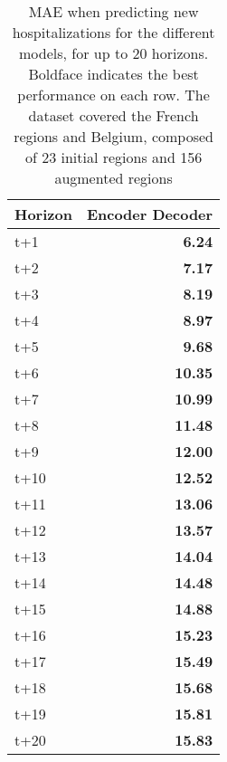 \begin{table}[H]
\centering
\caption{MAE when predicting new hospitalizations for the different models, for up to 20 horizons. Boldface indicates the best performance on each row. The dataset covered the French regions and Belgium, composed of 23 initial regions and 156 augmented regions }
\label{tab:MAE_comparison}
\begin{tabular}{lr}
\toprule
Horizon &  Encoder Decoder \\
\midrule
t+1  & \textbf{6.24}  \\
t+2  & \textbf{7.17}  \\
t+3  & \textbf{8.19}  \\
t+4  & \textbf{8.97}  \\
t+5  & \textbf{9.68}  \\
t+6  & \textbf{10.35}  \\
t+7  & \textbf{10.99}  \\
t+8  & \textbf{11.48}  \\
t+9  & \textbf{12.00}  \\
t+10  & \textbf{12.52}  \\
t+11  & \textbf{13.06}  \\
t+12  & \textbf{13.57}  \\
t+13  & \textbf{14.04}  \\
t+14  & \textbf{14.48}  \\
t+15  & \textbf{14.88}  \\
t+16  & \textbf{15.23}  \\
t+17  & \textbf{15.49}  \\
t+18  & \textbf{15.68}  \\
t+19  & \textbf{15.81}  \\
t+20  & \textbf{15.83}  \\

\bottomrule
\end{tabular}
\end{table}
